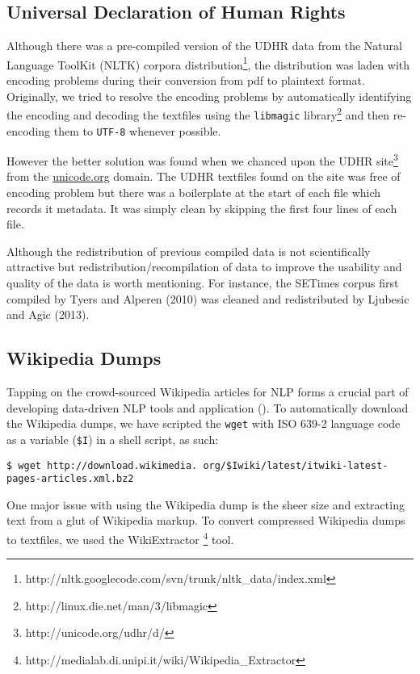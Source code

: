 \documentclass[11pt]{article}
\begin{document}
\subsection{Universal Declaration of Human Rights}

Although there was a pre-compiled version of the UDHR data from the Natural Language ToolKit (NLTK) corpora distribution\footnote{http://nltk.googlecode.com/svn/trunk/nltk\_data/index.xml}, the distribution was laden with encoding problems during their conversion from pdf to plaintext format. Originally, we tried to resolve the encoding problems by automatically identifying the encoding and decoding the textfiles using the \texttt{libmagic} library\footnote{http://linux.die.net/man/3/libmagic} and then re-encoding them to \texttt{UTF-8} whenever possible. 

However the better solution was found when we chanced upon the UDHR site\footnote{http://unicode.org/udhr/d/} from the \url{unicode.org} domain. The UDHR textfiles found on the site was free of encoding problem but there was a boilerplate at the start of each file which records it metadata. It was simply clean by skipping the first four lines of each file. 

Although the redistribution of previous compiled data is not scientifically attractive but redistribution/recompilation of data to improve the usability and quality of the data is worth mentioning. For instance, the SETimes corpus first compiled by Tyers and Alperen (2010) was cleaned and redistributed by Ljubesic and Agic (2013).

\subsection{Wikipedia Dumps}

Tapping on the crowd-sourced Wikipedia articles for NLP forms a crucial part of developing data-driven NLP tools and application ({\color{red}{citation neeeded}}). To automatically download the Wikipedia dumps, we have scripted the \texttt{wget} with ISO 639-2 language code as a variable (\texttt{\$I}) in a shell script, as such:

\smallskip
\noindent \texttt{\$ wget http://download.wikimedia.
org/\$Iwiki/latest/itwiki-latest-
pages-articles.xml.bz2}
\medskip

\noindent One major issue with using the Wikipedia dump is the sheer size and extracting text from a glut of Wikipedia markup. To convert compressed Wikipedia dumps to textfiles, we used the WikiExtractor \footnote{http://medialab.di.unipi.it/wiki/Wikipedia\_Extractor} tool.
\end{document}
